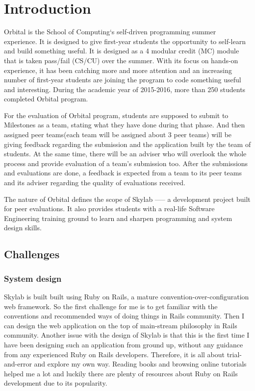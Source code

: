 \chapter{Introduction} \label{introduction}

Orbital is the School of Computing`s self-driven programming summer experience. It is designed to give first-year students the opportunity to self-learn and build something useful. It is designed as a 4 modular credit (MC) module that is taken pass/fail (CS/CU) over the summer\cite{citation0}. With its focus on hands-on experience, it has been catching more and more attention and an increasing number of first-year students are joining the program to code something useful and interesting. During the academic year of 2015-2016, more than 250 students completed Orbital program.

For the evaluation of Orbital program, students are supposed to submit to Milestones as a team, stating what they have done during that phase. And then assigned peer teams(each team will be assigned about 3 peer teams) will be giving feedback regarding the submission and the application built by the team of students. At the same time, there will be an adviser who will overlook the whole process and provide evaluation of a team's submission too. After the submissions and evaluations are done, a feedback is expected from a team to its peer teams and its adviser regarding the quality of evaluations received.

The nature of Orbital defines the scope of Skylab —-- a development project built for peer evaluations. It also provides students with a real-life Software Engineering training ground to learn and sharpen programming and system design skills. 

\section{Challenges}

\subsection{System design}
Skylab is built built using Ruby on Rails, a mature convention-over-configuration web framework. So the first challenge for me is to get familiar with the conventions and recommended ways of doing things in Rails community. Then I can design the web application on the top of main-stream philosophy in Rails community. Another issue with the design of Skylab is that this is the first time I have been designing such an application from ground up, without any guidance from any experienced Ruby on Rails developers. Therefore, it is all about trial-and-error and explore my own way. Reading books and browsing online tutorials helped me a lot and luckily there are plenty of resources about Ruby on Rails development due to its popularity.

